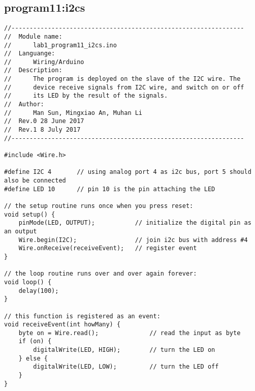\subsection{program11:i2cs}
\begin{verbatim}
//----------------------------------------------------------------
//  Module name:
//      lab1_program11_i2cs.ino
//  Languange:
//      Wiring/Arduino
//  Description:
//      The program is deployed on the slave of the I2C wire. The
//      device receive signals from I2C wire, and switch on or off 
//      its LED by the result of the signals. 
//  Author:
//      Man Sun, Mingxiao An, Muhan Li
//  Rev.0 28 June 2017
//  Rev.1 8 July 2017
//----------------------------------------------------------------

#include <Wire.h>

#define I2C 4       // using analog port 4 as i2c bus, port 5 should also be connected
#define LED 10      // pin 10 is the pin attaching the LED

// the setup routine runs once when you press reset:
void setup() {
    pinMode(LED, OUTPUT);           // initialize the digital pin as an output
    Wire.begin(I2C);                // join i2c bus with address #4
    Wire.onReceive(receiveEvent);   // register event
}

// the loop routine runs over and over again forever:
void loop() {
    delay(100);
}

// this function is registered as an event:
void receiveEvent(int howMany) {
    byte on = Wire.read();              // read the input as byte
    if (on) {
        digitalWrite(LED, HIGH);        // turn the LED on
    } else {
        digitalWrite(LED, LOW);         // turn the LED off
    }
}
\end{verbatim}